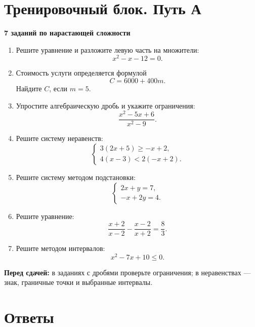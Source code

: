 \documentclass[a4paper,12pt]{article}
\begin{document}
\section{Тренировочный блок. Путь А}

\begin{center}
{\large\bfseries 7 заданий по нарастающей сложности}
\end{center}

\vspace{2mm}

\begin{enumerate}[leftmargin=9mm,label=\textbf{\arabic*.},itemsep=5mm]

\item Решите уравнение и разложите левую часть на множители:
\[
x^2-x-12=0.
\]

\item Стоимость услуги определяется формулой
\[
C=6000+400m.
\]
Найдите \(C\), если \(m=5\).

\item Упростите алгебраическую дробь и укажите ограничения:
\[
\frac{x^2-5x+6}{x^2-9}.
\]

\item Решите систему неравенств:
\[
\begin{cases}
3(2x+5)\ge -x+2,\\
4(x-3)<2(-x+2).
\end{cases}
\]

\item Решите систему методом подстановки:
\[
\begin{cases}
2x+y=7,\\
-x+2y=4.
\end{cases}
\]

\item Решите уравнение:
\[
\frac{x+2}{x-2}-\frac{x-2}{x+2}=\frac83.
\]

\item Решите методом интервалов:
\[
x^2-7x+10\le0.
\]

\end{enumerate}

\vfill

\noindent\textbf{Перед сдачей:} в заданиях с дробями проверьте ограничения; в неравенствах --- знак, граничные точки и выбранные интервалы.

\clearpage
\section{Ответы}
\end{document}
